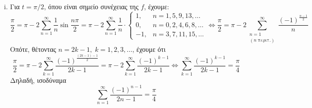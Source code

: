 \documentclass[a4paper,table]{report}
\begin{document}
\begin{solution}
\begin{enumerate}[i)]
    \item Για $ t= \pi /2 $, όπου είναι σημείο συνέχειας της $f$, έχουμε:
      \[
        \frac{\pi}{2} = \pi - 2 \sum_{n=1}^{\infty} \frac{1}{n} \sin{\frac{n \pi}{2}} =
        \pi - 2 \sum_{n=1}^{\infty} \frac{1}{n} \cdot 
        \begin{cases}
          1, & n=1,5,9,13,\ldots \\
          0, &n=0,2,4,6,8,\ldots \\
          -1, & n=3,7,11,15,\ldots 
        \end{cases} \Leftrightarrow  
        \frac{\pi}{2} = \pi - 2 \sum_{\substack{n=1 \\ (n \; \text{περιτ.})}}^{\infty}
        \frac{(-1)^{\frac{n-1}{2}}}{n} 
      \]
      Οπότε, θέτοντας $ n=2k-1, \; k=1,2,3,\ldots $, έχουμε ότι
      \[
        \frac{\pi}{2} = \pi - 2 \sum_{k=1}^{\infty} 
        \frac{(-1)^{\frac{(2k-1)-1}{2}}}{2k-1} = \pi -2 
          \sum_{k=1}^{\infty} \frac{(-1)^{k-1}}{2k-1} \Leftrightarrow
          \sum_{k=1}^{\infty} \frac{(-1)^{k-1}}{2k-1} = \frac{\pi}{4}
        \]
        Δηλαδή, ισοδύναμα 
        \[
          \sum_{n=1}^{\infty} \frac{(-1)^{n-1}}{2n-1} = \frac{\pi}{4}  
        \]
    \end{enumerate}
\end{solution}
\end{document}
